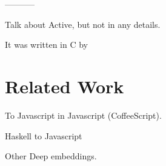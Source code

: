 \documentclass{llncs}
\begin{document}
-----------

Talk about Active, but not in any details.


 It was written
in C by 

\section{Related Work}

To Javascript in Javascript (CoffeeScript).

Haskell to Javascript

Other Deep embeddings.

%
%




\end{document}
